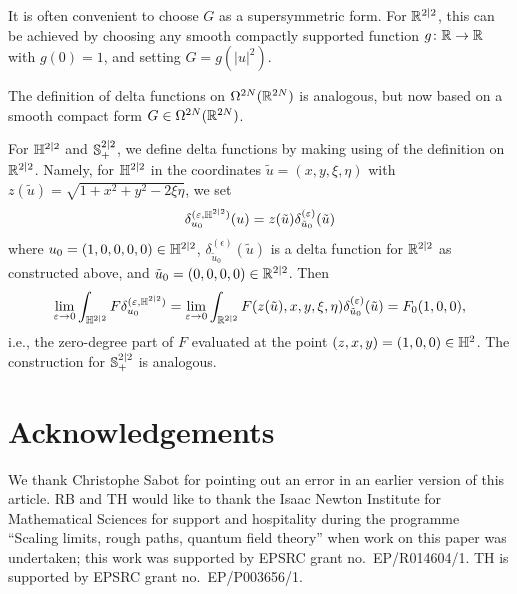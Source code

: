\documentclass[11pt,a4paper]{article}
\begin{document}
It is often convenient to choose $G$ as a supersymmetric form. For
$\mathbb{R}^{2|2}$, this can be achieved by choosing any smooth compactly
supported function $g\colon \mathbb{R} \rightarrow \mathbb{R}$ with $g(0) = 1$, and
setting $G = g(|u|^2)$.

The definition of delta functions on $\Omega^{2N}(\mathbb{R}^{2N})$ is
analogous, but now based on a smooth compact form $G\in \Omega^{2N}(\mathbb{R}^{2N})$. 

For $\mathbb{H}^{2|2}$ and ${\mathbb S}^{2|2}_{+}$, we define delta functions by
making using of the definition on $\mathbb{R}^{2|2}$. Namely, for $\mathbb{H}^{2|2}$
in the coordinates $\tilde u = (x,y,\xi,\eta)$ with
$z(\tilde u) = \sqrt{1+ x^2+y^2-2\xi\eta}$, we set
\begin{equation}
  \delta^{(\varepsilon, \mathbb{H}^{2|2})}_{u_0}(u) = z(\tilde u)\delta^{(\varepsilon)}_{\tilde u_0}(\tilde u)
\end{equation}
where $u_0=(1,0,0,0,0)
\in \mathbb{H}^{2|2}$, $\delta^{(\epsilon)}_{\tilde u_0}(\tilde u)$
is a delta function for $\mathbb{R}^{2|2}$ as constructed above,
and $\tilde u_0 = (0,0,0,0) \in \mathbb{R}^{2|2}$. 
Then
\begin{equation}
  \lim_{\varepsilon\to 0} \int_{\mathbb{H}^{2|2}} F \delta^{(\varepsilon, \mathbb{H}^{2|2})}_{u_0}
  =
  \lim_{\varepsilon\to 0} \int_{\mathbb{R}^{2|2}} F(z(\tilde u),x,y,\xi,\eta)
  \delta^{(\varepsilon)}_{\tilde{u}_0}(\tilde u) =   F_{0}(1,0,0), 
\end{equation}
i.e., the zero-degree part of $F$ evaluated at the point $(z,x,y) = (1,0,0) \in \mathbb{H}^{2}$.
The construction for ${\mathbb S}^{2|2}_+$ is analogous.


\section*{Acknowledgements}
\label{sec:acknowledgements}

We thank Christophe Sabot for pointing out an error in an earlier
version of this article. RB and TH would like to thank the Isaac
Newton Institute for Mathematical Sciences for support and hospitality
during the programme ``Scaling limits, rough paths, quantum field
theory'' when work on this paper was undertaken; this work was
supported by EPSRC grant no.\ EP/R014604/1. TH is supported by EPSRC
grant no.\ EP/P003656/1.






\end{document}
